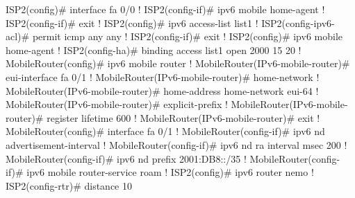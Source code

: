 ISP2(config)# interface fa 0/0              
!
ISP2(config-if)# ipv6 mobile home-agent
!
ISP2(config-if)# exit
!
ISP2(config)# ipv6 access-list list1              
!
ISP2(config-ipv6-acl)# permit icmp any any
!
ISP2(config-if)# exit
!
ISP2(config)# ipv6 mobile home-agent              
!
ISP2(config-ha)# binding access list1 open 2000 15 20
!
MobileRouter(config)# ipv6 mobile router
!
MobileRouter(IPv6-mobile-router)# eui-interface fa 0/1
!
MobileRouter(IPv6-mobile-router)# home-network
!
MobileRouter(IPv6-mobile-router)# home-address home-network
                                  eui-64
!
MobileRouter(IPv6-mobile-router)# explicit-prefix
!
MobileRouter(IPv6-mobile-router)# register lifetime 600
!
MobileRouter(IPv6-mobile-router)# exit
!
MobileRouter(config)# interface fa 0/1
!
MobileRouter(config-if)# ipv6 nd advertisement-interval
!
MobileRouter(config-if)# ipv6 nd ra interval msec 200
!
MobileRouter(config-if)# ipv6 nd prefix 2001:DB8::/35
!
MobileRouter(config-if)# ipv6 mobile router-service roam
!
ISP2(config)# ipv6 router nemo
!
ISP2(config-rtr)# distance 10